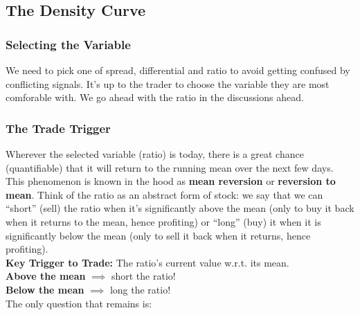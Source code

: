 \documentclass{article}
\begin{document}
\subsection{The Density Curve}
\subsubsection{Selecting the Variable}
We need to pick one of spread, differential and ratio to avoid getting confused
by conflicting signals. It's up to the trader to choose the variable they are 
most comforable with. We go ahead with the ratio in the discussions ahead.
\subsubsection{The Trade Trigger}
Wherever the selected variable (ratio) is today, there is a great chance
(quantifiable) that it will return to the running mean over the next few days.
This phenomenon is known in the hood as \textbf{mean reversion} or \textbf{reversion to mean}. Think of the ratio as an abstract form of stock:
 we say that we can ``short'' (sell) the ratio when it's
significantly above the mean (only to buy it back when it returns to the mean,
hence profiting) or ``long'' (buy) it when it is significantly below 
the mean (only to sell it back when it returns, hence profiting).\\
\textbf{Key Trigger to Trade:} The ratio's current value w.r.t. its mean.\\
\indent \textbf{Above the mean} $\implies$ short the ratio!\\
\indent \textbf{Below the mean} $\implies$ long the ratio!\\
The only question that remains is:
\begin{center}
\end{center}
\end{document}
